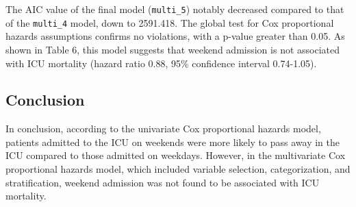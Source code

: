 \documentclass[
]{article}
\begin{document}
The AIC value of the final model (\texttt{multi\_5}) notably decreased
compared to that of the \texttt{multi\_4} model, down to 2591.418. The
global test for Cox proportional hazards assumptions confirms no
violations, with a p-value greater than 0.05. As shown in Table 6, this
model suggests that weekend admission is not associated with ICU
mortality (hazard ratio 0.88, 95\% confidence interval 0.74-1.05).

\hypertarget{conclusion}{%
\subsection{Conclusion}\label{conclusion}}

In conclusion, according to the univariate Cox proportional hazards
model, patients admitted to the ICU on weekends were more likely to pass
away in the ICU compared to those admitted on weekdays. However, in the
multivariate Cox proportional hazards model, which included variable
selection, categorization, and stratification, weekend admission was not
found to be associated with ICU mortality.
\end{document}
